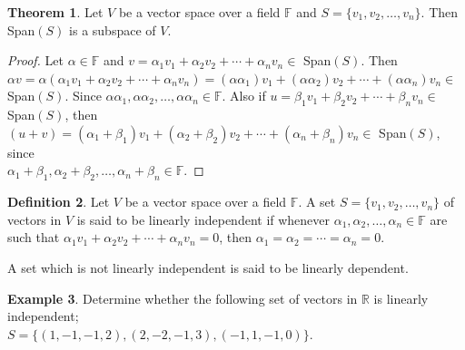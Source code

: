 \documentclass[11pt,a4paper]{article}
\theoremstyle{definition}
\newtheorem{thm}{Theorem}[subsection]
\newtheorem{defn}[thm]{Definition}
\newtheorem{exa}[thm]{Example}
\begin{document}
\begin{thm}
Let $V$ be a vector space over a field $\mathbb{F}$ and $S=\{v_1,v_2,\dots,v_n\}$. Then Span$(S)$ is a subspace of $V$.
\end{thm}
\begin{proof}
Let $\alpha \in \mathbb{F}$ and $v=\alpha_1v_1+\alpha_2v_2+\cdots+\alpha_nv_n\in $ Span$(S)$. Then $\alpha v=\alpha(\alpha_1v_1+\alpha_2v_2+\cdots+\alpha_nv_n)=(\alpha\alpha_1)v_1+(\alpha\alpha_2)v_2+\cdots+(\alpha\alpha_n)v_n\in$ Span$(S)$. Since $\alpha\alpha_1, \alpha\alpha_2,\dots,\alpha\alpha_n\in \mathbb{F}$. Also if $u=\beta_1v_1+\beta_2v_2+\cdots+\beta_nv_n\in$ Span$(S)$, then $(u+v)=(\alpha_1+\beta_1)v_1+(\alpha_2+\beta_2)v_2+\cdots+(\alpha_n+\beta_n)v_n\in$ Span$(S)$, since\\ $\alpha_1+\beta_1, \alpha_2+\beta_2,\dots,\alpha_n+\beta_n\in \mathbb{F}$.
\end{proof}


\begin{defn}
Let $V$ be a vector space over a field $\mathbb{F}$. A set $S=\{v_1,v_2,\dots,v_n\}$ of vectors in $V$ is said to be linearly independent if whenever $\alpha_1, \alpha_2,\dots,\alpha_n\in \mathbb{F}$ are such that $\alpha_1v_1+\alpha_2v_2+\cdots+\alpha_nv_n=0$, then $\alpha_1=\alpha_2=\cdots=\alpha_n=0$.

A set which is not linearly independent is said to be linearly dependent.
\end{defn}

\begin{exa}
Determine whether the following set of vectors in $\mathbb{R}$ is linearly independent;\\ $S=\{(1,-1,-1,2), (2,-2,-1,3), (-1,1,-1,0)\}$.
\end{exa}
\end{document}

